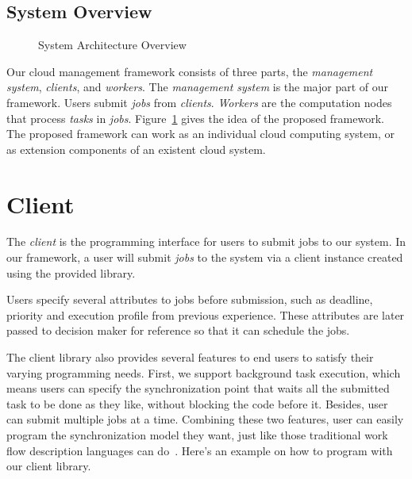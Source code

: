 \subsection{System Overview}	%

\begin{figure}[htbp]
\centering

\caption{System Architecture Overview}
\label{fig:archi-overview}
\end{figure}

Our cloud management framework consists of three parts, the \emph{
management system}, \emph{clients}, and \emph{workers}.
The \emph{management system} is the major part of our framework.
Users submit \emph{jobs} from \emph{clients}.
\emph{Workers} are the computation nodes that process \emph{tasks} in \emph{
jobs}.
Figure~\ref{fig:archi-overview} gives the idea of the proposed
framework.
The proposed framework can work as an individual cloud computing system,
or as extension components of an existent cloud system.

\section{Client}	%

The \emph{client} is the programming interface for users to submit jobs
to our system.
In our framework, a user will submit \emph{jobs} to the system via a
client instance created using the provided library.

Users specify several attributes to jobs before submission, such as
deadline, priority and execution profile from previous experience.
These attributes are later passed to decision maker for reference so
that it can schedule the jobs.

The client library also provides several features to end users to
satisfy their varying programming needs.
First, we support background task execution, which means users can
specify the synchronization point that waits all the submitted task to
be done as they like, without blocking the code before it.
Besides, user can submit multiple jobs at a time.
Combining these two features, user can easily program the
synchronization model they want, just like those traditional work flow
description languages can do~\cite{cite:workflow-management}.
Here's an example on how to program with our client library.

